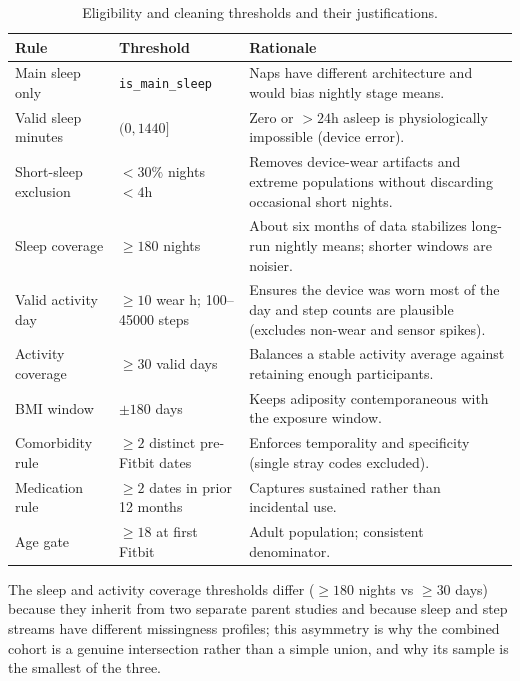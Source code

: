 \documentclass[11pt]{article}
\newcommand{\code}[1]{\texttt{\small #1}}
\begin{document}
\begin{table}[h]
\centering
\footnotesize
\begin{tabular}{@{}p{3.9cm}p{3.0cm}p{6.0cm}@{}}
\toprule
\textbf{Rule} & \textbf{Threshold} & \textbf{Rationale} \\
\midrule
Main sleep only & \code{is_main_sleep} & Naps have different architecture and would bias nightly stage means. \\
Valid sleep minutes & $(0, 1440]$ & Zero or $>24$h asleep is physiologically impossible (device error). \\
Short-sleep exclusion & $<30\%$ nights $<4$h & Removes device-wear artifacts and extreme populations without discarding occasional short nights. \\
Sleep coverage & $\geq 180$ nights & About six months of data stabilizes long-run nightly means; shorter windows are noisier. \\
Valid activity day & $\geq 10$ wear h; 100--45000 steps & Ensures the device was worn most of the day and step counts are plausible (excludes non-wear and sensor spikes). \\
Activity coverage & $\geq 30$ valid days & Balances a stable activity average against retaining enough participants. \\
BMI window & $\pm 180$ days & Keeps adiposity contemporaneous with the exposure window. \\
Comorbidity rule & $\geq 2$ distinct pre-Fitbit dates & Enforces temporality and specificity (single stray codes excluded). \\
Medication rule & $\geq 2$ dates in prior 12 months & Captures sustained rather than incidental use. \\
Age gate & $\geq 18$ at first Fitbit & Adult population; consistent denominator. \\
\bottomrule
\end{tabular}
\caption{Eligibility and cleaning thresholds and their justifications.}
\label{tab:thresholds}
\end{table}

\noindent The sleep and activity coverage thresholds differ ($\geq 180$ nights vs $\geq 30$ days)
because they inherit from two separate parent studies and because sleep and step streams have different
missingness profiles; this asymmetry is why the combined cohort is a genuine intersection rather than a
simple union, and why its sample is the smallest of the three.

\end{document}
